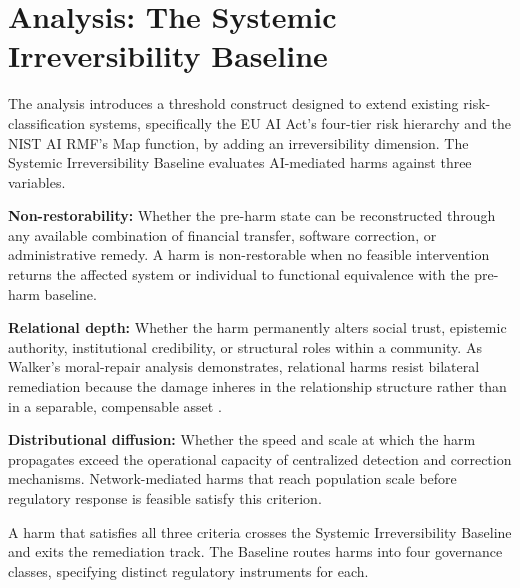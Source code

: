 \documentclass[11pt]{article}
\begin{document}
\section{Analysis: The Systemic Irreversibility Baseline}


The analysis introduces a threshold construct designed to extend existing risk-classification systems, specifically the EU AI Act's four-tier risk hierarchy and the NIST AI RMF's Map function, by adding an irreversibility dimension. The Systemic Irreversibility Baseline evaluates AI-mediated harms against three variables.

\textbf{Non-restorability:} Whether the pre-harm state can be reconstructed through any available combination of financial transfer, software correction, or administrative remedy. A harm is non-restorable when no feasible intervention returns the affected system or individual to functional equivalence with the pre-harm baseline.

\textbf{Relational depth:} Whether the harm permanently alters social trust, epistemic authority, institutional credibility, or structural roles within a community. As Walker's moral-repair analysis demonstrates, relational harms resist bilateral remediation because the damage inheres in the relationship structure rather than in a separable, compensable asset \parencite{walker2006}.

\textbf{Distributional diffusion:} Whether the speed and scale at which the harm propagates exceed the operational capacity of centralized detection and correction mechanisms. Network-mediated harms that reach population scale before regulatory response is feasible satisfy this criterion.

A harm that satisfies all three criteria crosses the Systemic Irreversibility Baseline and exits the remediation track. The Baseline routes harms into four governance classes, specifying distinct regulatory instruments for each.
\end{document}
